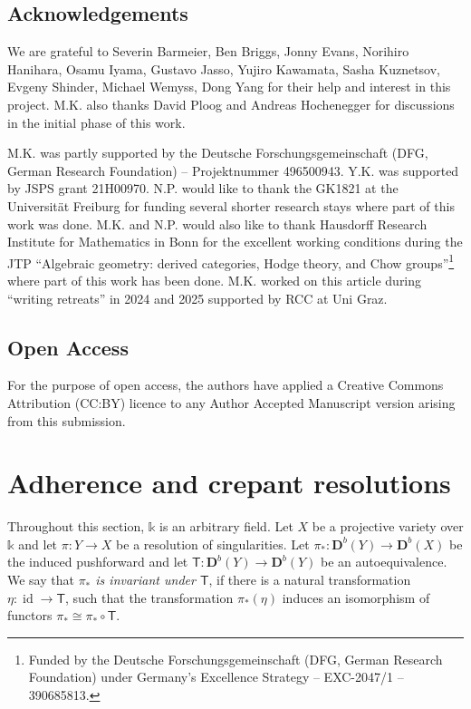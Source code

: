 \documentclass[a4paper,11pt, reqno]{amsart}
\def\DD{\mathbf D}
\def\id{{\operatorname{id}}}
\def\Db{\DD^b}
\newcommand{\bT}{\mathsf{T}}
\theoremstyle{plain}
\theoremstyle{definition}
\numberwithin{equation}{section}
\begin{document}
\subsection*{Acknowledgements}
 We are grateful to Severin Barmeier, Ben Briggs, Jonny Evans, Norihiro Hanihara, Osamu Iyama, Gustavo Jasso, Yujiro Kawamata, Sasha Kuznetsov, Evgeny Shinder, Michael Wemyss, Dong Yang for their help and interest in this project.
 M.K. also thanks David Ploog and Andreas Hochenegger for discussions in the initial phase of this work.

M.K. was partly supported by the Deutsche Forschungsgemeinschaft (DFG, German Research Foundation) –
Projektnummer 496500943.
Y.K. was supported by JSPS grant 21H00970.
N.P. would like to thank the GK1821 at the Universit\"at Freiburg for funding several shorter research stays where part of this work was done. 
M.K. and N.P. would also like to thank Hausdorff Research Institute for Mathematics in Bonn for the excellent working conditions during the JTP ``Algebraic geometry: derived categories, Hodge theory, and Chow groups''\footnote{Funded by the Deutsche Forschungsgemeinschaft (DFG, German Research Foundation) under Germany's Excellence Strategy – EXC-2047/1 – 390685813.} where part of this work has been done. M.K. worked on this article during ``writing retreats'' in 2024 and 2025 supported by RCC at Uni Graz. 

\subsection*{Open Access} 
For the purpose of open access, the authors have applied a Creative Commons Attribution (CC:BY) licence to any Author Accepted Manuscript version arising from this submission.



\section{Adherence and crepant resolutions}\label{sec:adherence}

Throughout this section, $\mathbb{k}$ is an arbitrary field.
Let $X$ be a projective variety over $\mathbb{k}$ and let $\pi : Y \to X $ be a resolution of singularities.
    Let $\pi_\ast : \Db(Y) \to \Db(X)$ be the induced pushforward and let  $\bT : \Db (Y) \to \Db (Y)$ be an autoequivalence.
    We say that \emph{$\pi_\ast $ is invariant under $\bT$},  if there is a natural transformation $\eta : \id \to \bT$, such that the transformation $\pi_\ast ( \eta )$ induces an isomorphism of functors $\pi_\ast \cong \pi_\ast \circ \bT$.
\end{document}

